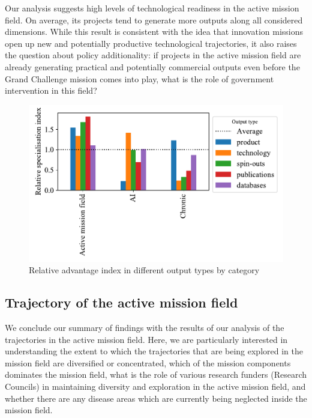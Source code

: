 \documentclass[11pt]{article}
\begin{document}
Our analysis suggests high levels of technological readiness in the active mission field. On average, its projects tend to generate more outputs along all considered dimensions. While this result is consistent with the idea that innovation missions  open up new and potentially productive technological trajectories, it also raises the question about policy additionality: if projects in the active mission field are already generating practical and potentially commercial outputs even before the Grand Challenge mission comes into play, what is the role of government intervention in this field?

\begin{figure}[!ht]
    \centering
    \includegraphics[width=\textwidth]{figures/fig_17_outputs.pdf}
    \caption{Relative advantage index in different output types by category}
    \label{fig:outputs}
\end{figure}

\subsection{Trajectory of the active mission field}
\label{subsec:trajectory}

We conclude our summary of findings with the results of our analysis of the trajectories in the active mission field. Here, we are particularly interested in understanding the extent to which the trajectories that are being explored in the mission field are diversified or concentrated, which of the mission components dominates the mission field, what is the role of various research funders (Research Councils) in maintaining diversity and exploration in the active mission field, and whether there are any disease areas which are currently being neglected inside the mission field.
\end{document}
